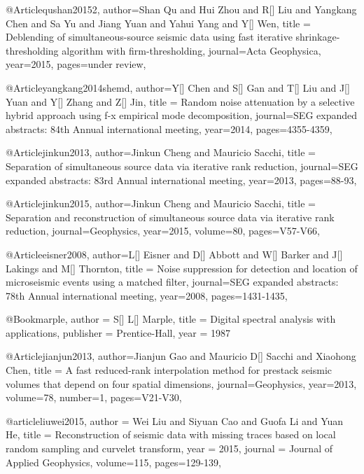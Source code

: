 {@Article{qushan20152,
  author={Shan Qu and Hui Zhou and R[] Liu and Yangkang Chen and Sa Yu and Jiang Yuan and Yahui Yang and Y[] Wen},
  title = {Deblending of simultaneous-source seismic data using fast iterative shrinkage-thresholding algorithm with firm-thresholding},
  journal={Acta Geophysica},
  year=2015,
  pages={under review},
} 

@Article{yangkang2014shemd,
  author={Y[] Chen and S[] Gan and T[] Liu and J[] Yuan and Y[] Zhang and Z[] Jin},
  title = {Random noise attenuation by a selective hybrid approach using f-x empirical mode decomposition},
  journal={SEG expanded abstracts: 84th Annual international meeting},
  year=2014,
  pages={4355-4359},
}


@Article{jinkun2013,
  author={Jinkun Cheng and Mauricio Sacchi},
  title = {Separation of simultaneous source data via iterative rank reduction},
  journal={SEG expanded abstracts: 83rd Annual international meeting},
  year=2013,
  pages={88-93},
}

@Article{jinkun2015,
  author={Jinkun Cheng and Mauricio Sacchi},
  title = {Separation and reconstruction of simultaneous source data via iterative rank reduction},
  journal={Geophysics},
  year=2015,
  volume=80,
  pages={V57-V66},
}

@Article{eisner2008,
  author={L[] Eisner and D[] Abbott and W[] Barker and J[] Lakings and M[] Thornton},
  title = {Noise suppression for detection and location of microseismic events using a matched filter},
  journal={SEG expanded abstracts: 78th Annual international meeting},
  year=2008,
  pages={1431-1435},
}




@Book{marple,
  author = 	 {S[] L[] Marple},
  title = 	 {Digital spectral analysis with applications},
  publisher = 	 {Prentice-Hall},
  year = 	 1987}
  












@Article{jianjun2013,
  author={Jianjun Gao and Mauricio D[] Sacchi and Xiaohong Chen},
  title = {A fast reduced-rank interpolation method for prestack seismic volumes that depend on four spatial dimensions},
  journal={Geophysics},
  year=2013,
  volume=78,
    number=1,
  pages={V21-V30},
}
	




@article{liuwei2015,
  author =	 {Wei Liu and Siyuan Cao and Guofa Li and Yuan He},
  title =	 {Reconstruction of seismic data with missing traces based on local random sampling and curvelet transform},
  year =	 2015,
  journal =	 {Journal of Applied Geophysics},
  volume={115},
 pages=129-139,
}







}
